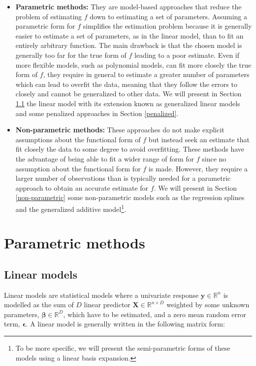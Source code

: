 \documentclass[]{book}
\begin{document}
\begin{itemize}
\item
  \textbf{Parametric methods:} They are model-based approaches that reduce
  the problem of estimating \(f\) down to estimating a set of
  parameters. Assuming a parametric form for \(f\) simplifies the
  estimation problem because it is generally easier to estimate a set
  of parameters, as in the linear model, than to fit an entirely
  arbitrary function. The main drawback is that the chosen model is
  generally too far for the true form of \(f\) leading to a poor
  estimate. Even if more flexible models, such as polynomial models,
  can fit more closely the true form of \(f\), they require in general
  to estimate a greater number of parameters which can lead to overfit
  the data, meaning that they follow the errors to closely and cannot
  be generalized to other data. We will present in Section
  \ref{linmod} the linear model with its extension known as
  generalized linear models and some penalized approaches in Section
  \ref{penalized}.
\item
  \textbf{Non-parametric methods:} These approaches do not make explicit
  assumptions about the functional form of \(f\) but instead seek an
  estimate that fit closely the data to some degree to avoid
  overfitting. These methods have the advantage of being able to fit a
  wider range of form for \(f\) since no assumption about the functional
  form for \(f\) is made. However, they require a larger number of
  observations than is typically needed for a parametric approach to
  obtain an accurate estimate for \(f\). We will present in Section
  \ref{non-parametric} some non-parametric models such as the
  regression splines and the generalized additive model\footnote{To be more specific, we will present the semi-parametric forms of
    these models using a linear basis expansion.}.
\end{itemize}

\hypertarget{parametric}{%
\section{Parametric methods}\label{parametric}}

\hypertarget{linmod}{%
\subsection{Linear models}\label{linmod}}

Linear models are statistical models where a univariate response
\(\mathbf{y} \in \mathbb{R}^n\) is modelled as the sum of \(D\) linear predictor
\(\mathbf{X} \in \mathbb{R}^{n \times D}\) weighted by some unknown parameters,
\(\boldsymbol{\beta} \in \mathbb{R}^D\), which have to be estimated, and a zero mean random
error term, \(\boldsymbol{\epsilon}\). A linear model is generally written in the
following matrix form:
\end{document}
